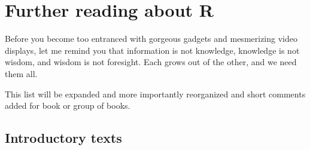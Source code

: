 \documentclass[krantz2]{krantz}\usepackage{knitr}%
\begin{document}
\begin{knitrout}\footnotesize
{}\color{fgcolor}\begin{kframe}
\begin{alltt}
\hlstd{(}\hlopt{:}
\hlstd{(}\hlopt{:}
\hlstd{(}\hlopt{:}
\hlstd{(}\hlopt{:}
\hlstd{(}\hlopt{:}
\hlstd{(}\hlopt{:}
\end{alltt}
\end{kframe}
\end{knitrout}









\chapter{Further reading about R}\label{chap:R:readings}

\begin{VF}
Before you become too entranced with gorgeous gadgets and mesmerizing video displays, let me remind you that information is not knowledge, knowledge is not wisdom, and wisdom is not foresight. Each grows out of the other, and we need them all.

\end{VF}


\begin{warningbox}
  This list will be expanded and more importantly reorganized and short comments added for book or group of books.
\end{warningbox}

\section{Introductory texts}
\end{document}
